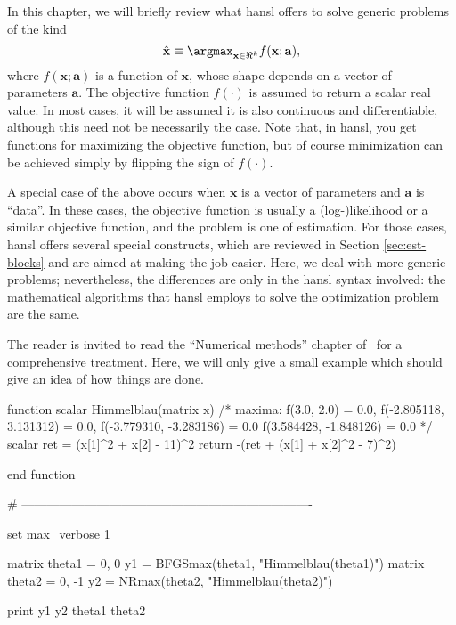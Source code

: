 In this chapter, we will briefly review what hansl offers to solve
generic problems of the kind
\[
\hat{\mathbf{x}} \equiv \argmax_{\mathbf{x} \in \Re^k} f(\mathbf{x}; \mathbf{a}),
\]
where $f(\mathbf{x}; \mathbf{a})$ is a function of $\mathbf{x}$, whose
shape depends on a vector of parameters $\mathbf{a}$. The objective
function $f(\cdot)$ is assumed to return a scalar real value. In most
cases, it will be assumed it is also continuous and differentiable,
although this need not be necessarily the case. Note that, in hansl,
you get functions for maximizing the objective function, but of course
minimization can be achieved simply by flipping the sign of
$f(\cdot)$.

A special case of the above occurs when $\mathbf{x}$ is a vector of
parameters and $\mathbf{a}$ is ``data''. In these cases, the objective
function is usually a (log-)likelihood or a similar objective
function, and the problem is one of estimation. For those cases, hansl
offers several special constructs, which are reviewed in Section
\ref{sec:est-blocks} and are aimed at making the job easier. Here, we
deal with more generic problems; nevertheless, the differences are
only in the hansl syntax involved: the mathematical algorithms that
hansl employs to solve the optimization problem are the same.

The reader is invited to read the ``Numerical methods'' chapter of
\GUG\ for a comprehensive treatment. Here, we will only give a small
example which should give an idea of how things are done.

\begin{code}
function scalar Himmelblau(matrix x)
    /* maxima:
    f(3.0, 2.0) = 0.0, 
    f(-2.805118, 3.131312) = 0.0,
    f(-3.779310, -3.283186) = 0.0
    f(3.584428, -1.848126) = 0.0
    */
    scalar ret = (x[1]^2 + x[2] - 11)^2
    return -(ret + (x[1] + x[2]^2 - 7)^2)

end function

# ----------------------------------------------------------------------

set max_verbose 1

matrix theta1 = { 0, 0 }
y1 = BFGSmax(theta1, "Himmelblau(theta1)")
matrix theta2 = { 0, -1 }
y2 = NRmax(theta2, "Himmelblau(theta2)")

print y1 y2 theta1 theta2
\end{code}

